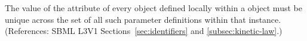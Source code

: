 The value of the attribute  of every \LocalParameter object
defined locally within a \KineticLaw object must be unique across the set
of all such parameter definitions within that \KineticLaw instance.
(References: SBML L3V1 Sections~\ref{sec:identifiers} and
\ref{subsec:kinetic-law}.)
